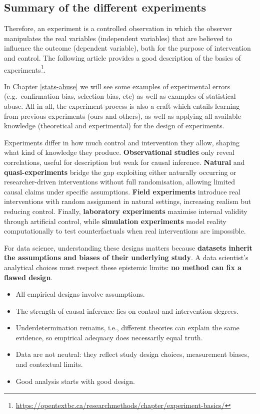 \documentclass[
  12pt,
]{book}
\providecommand{\tightlist}{%
  \setlength{\itemsep}{0pt}\setlength{\parskip}{0pt}}
\DeclareRobustCommand{\href}[2]{#2\footnote{\url{#1}}}
\begin{document}
\subsection{Summary of the different experiments}\label{summary-of-the-different-experiments}

Therefore, an experiment is a controlled observation in which the observer manipulates the real variables (independent variables) that are believed to influence the outcome (dependent variable), both for the purpose of intervention and control. The following article provides a good description of the \href{https://opentextbc.ca/researchmethods/chapter/experiment-basics/}{basics of experiments}.

In Chapter \ref{stats-abuse} we will see some examples of experimental errors (e.g.~confirmation bias, selection bias, etc) as well as examples of statistical abuse. All in all, the experiment process is also a craft which entails learning from previous experiments (ours and others), as well as applying all available knowledge (theoretical and experimental) for the design of experiments.

Experiments differ in how much control and intervention they allow, shaping what kind of knowledge they produce. \textbf{Observational studies} only reveal correlations, useful for description but weak for causal inference. \textbf{Natural} and \textbf{quasi-experiments} bridge the gap exploiting either naturally occurring or researcher-driven interventions without full randomisation, allowing limited causal claims under specific assumptions. \textbf{Field experiments} introduce real interventions with random assignment in natural settings, increasing realism but reducing control. Finally, \textbf{laboratory experiments} maximise internal validity through artificial control, while \textbf{simulation experiments} model reality computationally to test counterfactuals when real interventions are impossible.

For data science, understanding these designs matters because \textbf{datasets inherit the assumptions and biases of their underlying study}. A data scientist's analytical choices must respect these epistemic limits: \textbf{no method can fix a flawed design}.

\begin{itemize}
\tightlist
\item
  All empirical designs involve assumptions.
\item
  The strength of causal inference lies on control and intervention degrees.
\item
  Underdetermination remains, i.e., different theories can explain the same evidence, so empirical adequacy does necessarily equal truth.
\item
  Data are not neutral: they reflect study design choices, measurement biases, and contextual limits.
\item
  Good analysis starts with good design.
\end{itemize}
\end{document}
